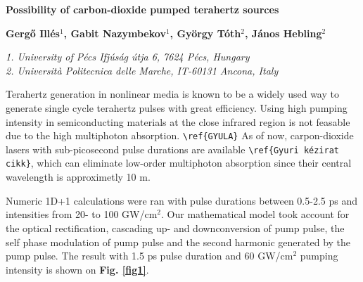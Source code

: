 \documentclass{article}
\begin{document}
\begin{center}
{\Large\bfseries
Possibility of carbon\hyp{}dioxide pumped terahertz sources\par}
\vspace{3ex}
{\bfseries
Gergő Illés$^{1}$, Gabit Nazymbekov$^{1}$, György Tóth$^{2}$, János Hebling$^{2}$\par}
{\footnotesize\itshape
1. University of Pécs Ifjúság útja 6, 7624 Pécs, Hungary\\
2. Universit\`a Politecnica delle Marche, IT-60131 Ancona, Italy\par}
\vspace{3ex}
\end{center}
Terahertz generation in nonlinear media is known to be a widely used way to generate single cycle terahertz pulses with great efficiency. Using high pumping intensity in semiconducting materials at the close infrared region is not feasable due to the high multiphoton absorption. \verb|\ref{GYULA}| As of now, carpon\hyp{}dioxide lasers with sub-picosecond pulse durations are available \verb|\ref{Gyuri kézirat cikk}|, which can eliminate low-order multiphoton absorption since their central wavelength is approximetly 10 \textmu m.

Numeric 1D+1 calculations were ran with pulse durations between 0.5\hyp{}2.5 ps and intensities from 20\hyp{} to 100 GW/cm$^2$. Our mathematical model took account for the optical rectification, cascading up\hyp{} and downconversion of pump pulse, the self phase modulation of pump pulse \cite{ravi2014limitations} and the second harmonic generated by the pump pulse. The result with 1.5 ps pulse duration and 60 GW/cm$^2$ pumping intensity is shown on \textbf{Fig.  \ref{fig1}}.

\end{document}
